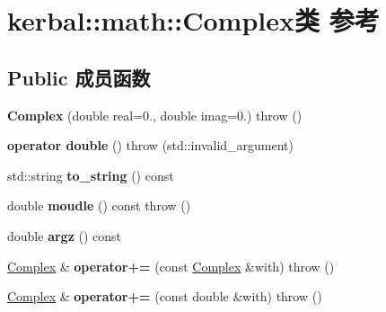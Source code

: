 \hypertarget{classkerbal_1_1math_1_1_complex}{}\section{kerbal\+:\+:math\+:\+:Complex类 参考}
\label{classkerbal_1_1math_1_1_complex}
\subsection*{Public 成员函数}
\begin{DoxyCompactItemize}
\item 
\mbox{\label{classkerbal_1_1math_1_1_complex_a4974492e2bf8a757e64bcfe1b180b89f}} 
{\bfseries Complex} (double real=0., double imag=0.)  throw ()
\item 
\mbox{\label{classkerbal_1_1math_1_1_complex_a06efe3c1034dc6de3c83faafbb3ef71d}} 
{\bfseries operator double} ()  throw (std\+::invalid\+\_\+argument)
\item 
\mbox{\label{classkerbal_1_1math_1_1_complex_a4303459a5624c1a11db9a9960a745485}} 
std\+::string {\bfseries to\+\_\+string} () const
\item 
\mbox{\label{classkerbal_1_1math_1_1_complex_a0ff1921e11e74088abc4a5b314365f07}} 
double {\bfseries moudle} () const  throw ()
\item 
\mbox{\label{classkerbal_1_1math_1_1_complex_a3217035a433704e9515fb92137eae91a}} 
double {\bfseries argz} () const
\item 
\mbox{\label{classkerbal_1_1math_1_1_complex_ae3c55c930abfa4a337fea275e41e30f8}} 
\hyperlink{classkerbal_1_1math_1_1_complex}{Complex} \& {\bfseries operator+=} (const \hyperlink{classkerbal_1_1math_1_1_complex}{Complex} \&with)  throw ()
\item 
\mbox{\label{classkerbal_1_1math_1_1_complex_a7a3a9d5bcc9523c54d2973e2441a4aaa}} 
\hyperlink{classkerbal_1_1math_1_1_complex}{Complex} \& {\bfseries operator+=} (const double \&with)  throw ()

\end{DoxyCompactItemize}
